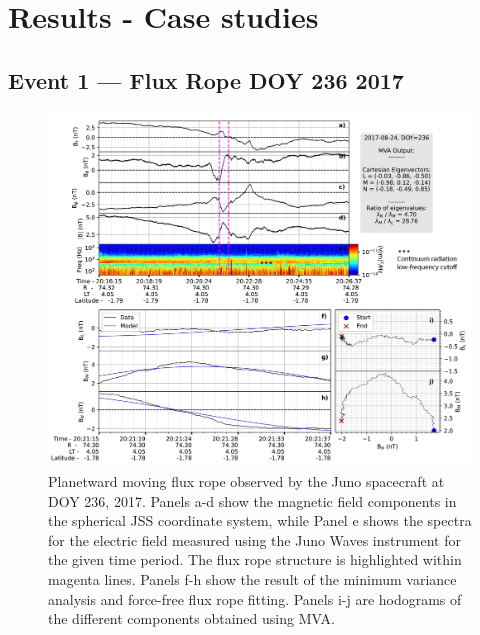 \section{Results - Case studies}
\subsection{Event 1 — Flux Rope DOY 236 2017}

\begin{figure}
    \centering
    \includegraphics[width=\textwidth]{images5/event-1-fluxrope.jpg}
    \caption{Planetward moving flux rope observed by the Juno spacecraft at DOY 236, 2017. Panels a-d show the magnetic field components in the spherical JSS coordinate system, while Panel e shows the spectra for the electric field measured using the Juno Waves instrument for the given time period. The flux rope structure is highlighted within magenta lines. Panels f-h show the result of the minimum variance analysis and force-free flux rope fitting. Panels i-j are hodograms of the different components obtained using MVA.}
    \label{fig:event-1-fluxrope}
\end{figure}


